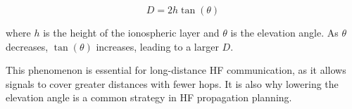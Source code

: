 \[
D = 2h \tan(\theta)
\]

where \( h \) is the height of the ionospheric layer and \( \theta \) is the elevation angle. As \( \theta \) decreases, \( \tan(\theta) \) increases, leading to a larger \( D \).

This phenomenon is essential for long-distance HF communication, as it allows signals to cover greater distances with fewer hops. It is also why lowering the elevation angle is a common strategy in HF propagation planning.

